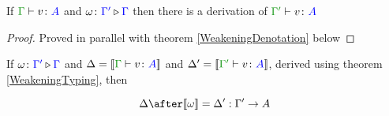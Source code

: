 \documentclass{report}
\begin{document}
\begin{theorem}
    \label{WeakeningTyping}
    If $\gtyperelation{v}{A}$ and $\omega \colon {\color{blue}\Gamma'} \triangleright {\color {blue} \Gamma}$ then there is a derivation of $\typerelation{\G'}{v}{A}$
\end{theorem}

\begin{proof}
    Proved in parallel with theorem \ref{WeakeningDenotation} below
\end{proof}



\begin{theorem}\label{WeakeningDenotations}
    If $\omega \colon {\color{blue}\Gamma'} \triangleright {\color {blue} \Gamma}$ and $\D = \deno{\gtyperelation{v}{A}}$ and $\D' = \deno{\typerelation{\G'}{v}{A}}$, derived using theorem \ref{WeakeningTyping}, then 
    
    $$
        \D \after \deno{\w} = \D' : \G' \rightarrow A
    $$
\end{theorem}
\end{document}

